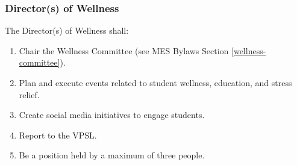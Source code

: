 
\subsubsection{Director(s) of Wellness}
\label{directors-of-wellness}
The Director(s) of Wellness shall:

\begin{enumerate}
 \item
  Chair the Wellness Committee (see MES Bylaws Section \ref{wellness-committee}).
 \item
  Plan and execute events related to student wellness, education, and stress relief.
 \item
  Create social media initiatives to engage students.
 \item
  Report to the VPSL.
 \item
  Be a position held by a maximum of three people.

\end{enumerate}